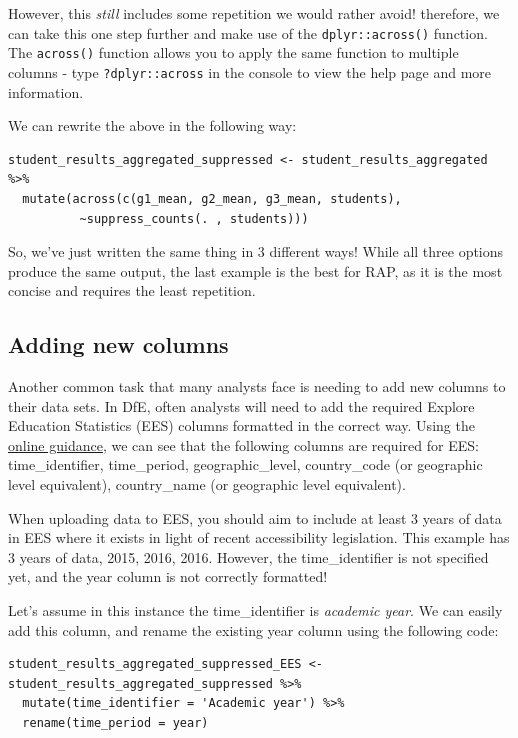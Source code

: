 \documentclass[
  12pt,
]{article}
\begin{document}
However, this \emph{still} includes some repetition we would rather
avoid! therefore, we can take this one step further and make use of the
\texttt{dplyr::across()} function. The \texttt{across()} function allows
you to apply the same function to multiple columns - type
\texttt{?dplyr::across} in the console to view the help page and more
information.

We can rewrite the above in the following way:

\begin{verbatim}
student_results_aggregated_suppressed <- student_results_aggregated %>%
  mutate(across(c(g1_mean, g2_mean, g3_mean, students), 
          ~suppress_counts(. , students)))
\end{verbatim}

So, we've just written the same thing in 3 different ways! While all
three options produce the same output, the last example is the best for
RAP, as it is the most concise and requires the least repetition.

\hypertarget{adding-new-columns}{%
\subsection{Adding new columns}\label{adding-new-columns}}

Another common task that many analysts face is needing to add new
columns to their data sets. In DfE, often analysts will need to add the
required Explore Education Statistics (EES) columns formatted in the
correct way. Using the
\href{https://rsconnect/rsc/stats-production-guidance/ud.html\#Overview_of_EES_data_files}{online
guidance}, we can see that the following columns are required for EES:
time\_identifier, time\_period, geographic\_level, country\_code (or
geographic level equivalent), country\_name (or geographic level
equivalent).

When uploading data to EES, you should aim to include at least 3 years
of data in EES where it exists in light of recent accessibility
legislation. This example has 3 years of data, 2015, 2016, 2016.
However, the time\_identifier is not specified yet, and the year column
is not correctly formatted!

Let's assume in this instance the time\_identifier is \emph{academic
year}. We can easily add this column, and rename the existing year
column using the following code:

\begin{verbatim}
student_results_aggregated_suppressed_EES <- student_results_aggregated_suppressed %>%
  mutate(time_identifier = 'Academic year') %>%
  rename(time_period = year)
\end{verbatim}
\end{document}
